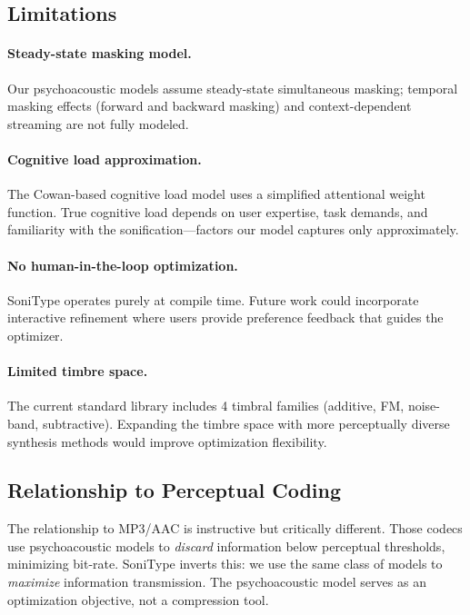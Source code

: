 \documentclass[sigchi, nonacm]{acmart}
\begin{document}
\subsection{Limitations}

\paragraph{Steady-state masking model.} Our psychoacoustic models assume steady-state simultaneous masking; temporal masking effects (forward and backward masking) and context-dependent streaming are not fully modeled.

\paragraph{Cognitive load approximation.} The Cowan-based cognitive load model uses a simplified attentional weight function. True cognitive load depends on user expertise, task demands, and familiarity with the sonification---factors our model captures only approximately.

\paragraph{No human-in-the-loop optimization.} SoniType operates purely at compile time. Future work could incorporate interactive refinement where users provide preference feedback that guides the optimizer.

\paragraph{Limited timbre space.} The current standard library includes 4 timbral families (additive, FM, noise-band, subtractive). Expanding the timbre space with more perceptually diverse synthesis methods would improve optimization flexibility.

\subsection{Relationship to Perceptual Coding}

The relationship to MP3/AAC is instructive but critically different. Those codecs use psychoacoustic models to \emph{discard} information below perceptual thresholds, minimizing bit-rate. SoniType inverts this: we use the same class of models to \emph{maximize} information transmission. The psychoacoustic model serves as an optimization objective, not a compression tool.
\end{document}
